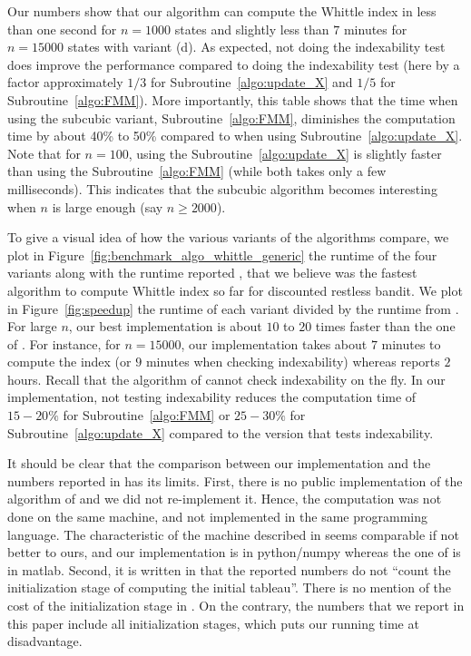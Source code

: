 Our numbers show that our algorithm can compute the Whittle index in less than one second for $n=1000$ states and slightly less than $7$ minutes for $n=15000$ states with variant (d). As expected, not doing the indexability test does improve the performance compared to doing the indexability test (here by a factor approximately $1/3$ for Subroutine~\ref{algo:update_X} and $1/5$ for Subroutine~\ref{algo:FMM}). More importantly, this table shows that the time when using the subcubic variant, Subroutine~\ref{algo:FMM}, diminishes the computation time by about 40\% to 50\% compared to when using Subroutine~\ref{algo:update_X}. Note that for $n=100$, using the Subroutine~\ref{algo:update_X} is slightly faster than using the Subroutine~\ref{algo:FMM} (while both takes only a few milliseconds). This indicates that the subcubic algorithm becomes interesting when $n$ is large enough (say $n\ge2000$).

To give a visual idea of how the various variants of the algorithms compare, we plot in Figure~\ref{fig:benchmark_algo_whittle_generic} the runtime of the four variants along with the runtime reported \cite{nino2020fast}, that we believe was the fastest algorithm to compute Whittle index so far for discounted restless bandit. We plot in Figure~\ref{fig:speedup} the runtime of each variant divided by the runtime from \cite{nino2020fast}. For large $n$, our best implementation is about $10$ to $20$ times faster than the one of \cite{nino2020fast}. For instance, for $n=15000$, our implementation takes about $7$ minutes to compute the index (or $9$ minutes when checking indexability) whereas \cite{nino2020fast} reports $2$ hours. Recall that the algorithm of \cite{nino2020fast} cannot check indexability on the fly. In our implementation, not testing indexability reduces the computation time of $15-20\%$ for Subroutine~\ref{algo:FMM} or $25-30\%$ for Subroutine~\ref{algo:update_X} compared to the version that tests indexability.

It should be clear that the comparison between our implementation and the numbers reported in \cite{nino2020fast} has its limits. First, there is no public implementation of the algorithm of \cite{nino2020fast} and we did not re-implement it. Hence, the computation was not done on the same machine, and not implemented in the same programming language. The characteristic of the machine described in \cite{nino2020fast} seems comparable if not better to ours, and our implementation is in python/numpy whereas the one of \cite{nino2020fast} is in matlab.  Second, it is written in \cite{nino2020fast} that the reported numbers do not ``count the initialization stage of computing the initial tableau''. There is no mention of the cost of the initialization stage in \cite{nino2020fast}. On the contrary, the numbers that we report in this paper include all initialization stages, which puts our running time at disadvantage. 

